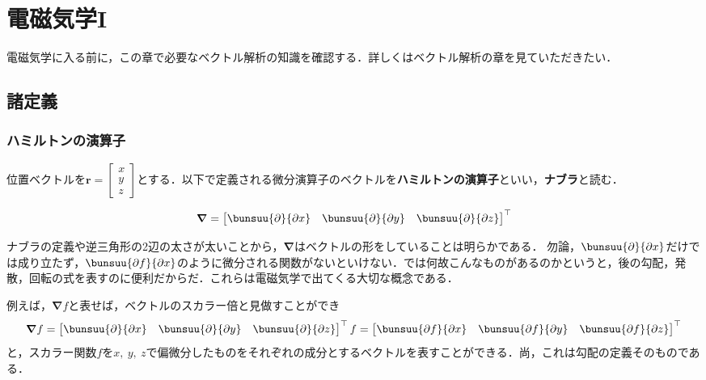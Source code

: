 \chapter{電磁気学I}
\setcounter{page}{1}


電磁気学に入る前に，この章で必要なベクトル解析の知識を確認する．詳しくはベクトル解析の章を見ていただきたい．



\section{諸定義}
\subsection{ハミルトンの演算子}

位置ベクトルを$\bm{r} =
\begin{bmatrix}
	x\\ y\\ z
\end{bmatrix}$とする．以下で定義される微分演算子のベクトルを\textbf{ハミルトンの演算子}といい，\textbf{ナブラ}と読む．

\begin{equation}
	\bm{\nabla} =
	\begin{bmatrix}
		\bunsuu{\partial}{\partial x} &
		\bunsuu{\partial}{\partial y} &
		\bunsuu{\partial}{\partial z}
	\end{bmatrix}^\top
\end{equation}

ナブラの定義や逆三角形の2辺の太さが太いことから，$\bm{\nabla}$はベクトルの形をしていることは明らかである．
勿論，$\bunsuu{\partial}{\partial x}$だけでは成り立たず，$\bunsuu{\partial f}{\partial x}$のように微分される関数がないといけない．では何故こんなものがあるのかというと，後の勾配，発散，回転の式を表すのに便利だからだ．これらは電磁気学で出てくる大切な概念である．

例えば，$\bm{\nabla} f$と表せば，ベクトルのスカラー倍と見做すことができ
\begin{equation*}
	\bm{\nabla} f =
	\begin{bmatrix}
		\bunsuu{\partial}{\partial x} &
		\bunsuu{\partial}{\partial y} &
		\bunsuu{\partial}{\partial z}
	\end{bmatrix}^\top
	f
	=
	\begin{bmatrix}
		\bunsuu{\partial f}{\partial x} &
		\bunsuu{\partial f}{\partial y} &
		\bunsuu{\partial f}{\partial z}
	\end{bmatrix}^\top
\end{equation*}
と，スカラー関数$f$を$x,\ y,\ z$で偏微分したものをそれぞれの成分とするベクトルを表すことができる．尚，これは勾配の定義そのものである．

